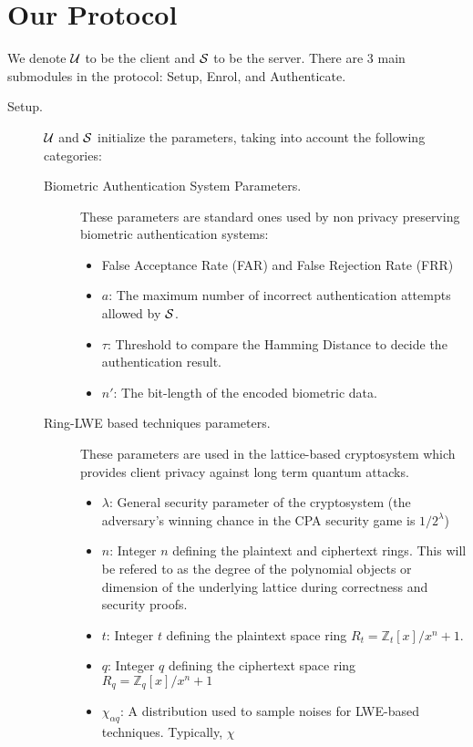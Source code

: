 \section{Our Protocol}
\label{sec:our_protocol}
We denote $\mathcal{U}$ to be the client and $\mathcal{S}$ to be the server. There are 3 main submodules in the protocol: Setup,
Enrol, and Authenticate.
\begin{description}
\item[Setup.] $\mathcal{U}$ and $\mathcal{S}$ initialize the parameters, taking into account the following categories:
  \begin{description}
  \item[Biometric Authentication System Parameters.] These parameters are standard ones used by non privacy preserving
    biometric authentication systems:
    \begin{itemize}
    \item False Acceptance Rate (FAR) and False Rejection Rate (FRR)
    \item $a$: The maximum number of incorrect authentication attempts allowed by $\mathcal{S}$.
    \item $\tau$: Threshold to compare the Hamming Distance to decide the authentication result.
    \item \(n'\): The bit-length of the encoded
      biometric data.
    \end{itemize}
  \item[Ring-LWE based techniques parameters.] These parameters are used in the lattice-based cryptosystem which provides
    client privacy against long term quantum attacks.
    \begin{itemize}
    \item $\lambda$: General security parameter of the cryptosystem (the adversary's winning chance in the CPA security game is \(1/2^{\lambda}\))
    \item $n$: Integer $n$ defining the plaintext and ciphertext rings. This will be refered to as the degree of
      the polynomial objects or dimension of the underlying lattice during correctness and security proofs.
    \item $t$: Integer $t$ defining the plaintext space ring $R_t = \mathbb{Z}_t[x]/x^n+1$.
    \item $q$: Integer $q$ defining the ciphertext space ring $R_q = \mathbb{Z}_q[x]/x^n+1$
    \item $\chi_{\alpha q}$: A distribution used to sample noises for LWE-based techniques.  Typically, $\chi$

\end{itemize}
\end{description}
\end{description}
